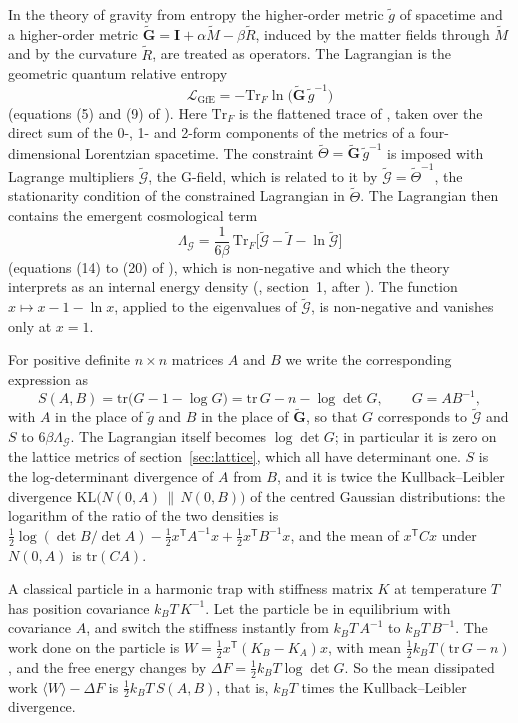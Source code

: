 \documentclass[11pt]{article}
\begin{document}
In the theory of gravity from entropy \cite{BianconiGfE, BianconiLambda} the higher-order metric $\tilde g$ of spacetime and a higher-order metric $\tilde{\mathbf G} = \mathbf I+\alpha\tilde M-\beta\tilde R$, induced by the matter fields through $\tilde M$ and by the curvature $\tilde R$, are treated as operators.
The Lagrangian is the geometric quantum relative entropy
\[
  \mathcal L_{\mathrm{GfE}} = -\mathrm{Tr}_F\ln\bigl(\tilde{\mathbf G}\,\tilde g^{-1}\bigr)
\]
(equations (5) and (9) of \cite{BianconiLambda}).
Here $\mathrm{Tr}_F$ is the flattened trace of \cite{BianconiGfE}, taken over the direct sum of the 0-, 1- and 2-form components of the metrics of a four-dimensional Lorentzian spacetime.
The constraint $\tilde\Theta = \tilde{\mathbf G}\,\tilde g^{-1}$ is imposed with Lagrange multipliers $\tilde{\mathcal G}$, the G-field, which is related to it by $\tilde{\mathcal G} = \tilde\Theta^{-1}$, the stationarity condition of the constrained Lagrangian in $\tilde\Theta$.
The Lagrangian then contains the emergent cosmological term
\[
  \Lambda_{\mathcal G} = \frac{1}{6\beta}\,\mathrm{Tr}_F\bigl[\tilde{\mathcal G}-\tilde I-\ln\tilde{\mathcal G}\bigr]
\]
(equations (14) to (20) of \cite{BianconiLambda}), which is non-negative and which the theory interprets as an internal energy density (\cite{BianconiLambda}, section~1, after \cite{BianconiThermo}).
The function $x\mapsto x-1-\ln x$, applied to the eigenvalues of $\tilde{\mathcal G}$, is non-negative and vanishes only at $x=1$.

For positive definite $n\times n$ matrices $A$ and $B$ we write the corresponding expression as
\[
  S(A,B) = \mathrm{tr}\bigl(G-1-\log G\bigr) = \mathrm{tr}\,G-n-\log\det G,\qquad G = AB^{-1},
\]
with $A$ in the place of $\tilde g$ and $B$ in the place of $\tilde{\mathbf G}$, so that $G$ corresponds to $\tilde{\mathcal G}$ and $S$ to $6\beta\Lambda_{\mathcal G}$.
The Lagrangian itself becomes $\log\det G$; in particular it is zero on the lattice metrics of section~\ref{sec:lattice}, which all have determinant one.
$S$ is the log-determinant divergence of $A$ from $B$, and it is twice the Kullback--Leibler divergence $\mathrm{KL}\bigl(N(0,A)\,\|\,N(0,B)\bigr)$ of the centred Gaussian distributions: the logarithm of the ratio of the two densities is $\tfrac12\log(\det B/\det A)-\tfrac12x^{\mathsf T}A^{-1}x+\tfrac12x^{\mathsf T}B^{-1}x$, and the mean of $x^{\mathsf T}Cx$ under $N(0,A)$ is $\mathrm{tr}(CA)$.

\physical
A classical particle in a harmonic trap with stiffness matrix $K$ at temperature $T$ has position covariance $k_BT\,K^{-1}$.
Let the particle be in equilibrium with covariance $A$, and switch the stiffness instantly from $k_BT\,A^{-1}$ to $k_BT\,B^{-1}$.
The work done on the particle is $W = \tfrac12x^{\mathsf T}(K_B-K_A)x$, with mean $\tfrac12k_BT(\mathrm{tr}\,G-n)$, and the free energy changes by $\Delta F = \tfrac12k_BT\log\det G$.
So the mean dissipated work $\langle W\rangle-\Delta F$ is $\tfrac12k_BT\,S(A,B)$, that is, $k_BT$ times the Kullback--Leibler divergence.
\end{document}
